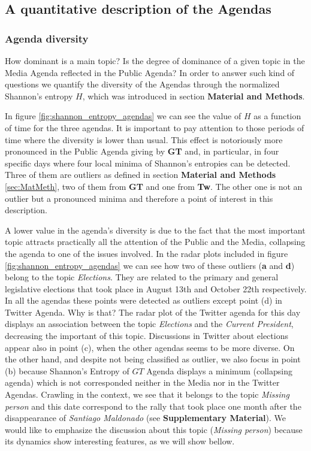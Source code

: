 \documentclass{bmcart}
\begin{document}
\subsection*{A quantitative description of the Agendas}

\subsubsection*{Agenda diversity}

\par How dominant is a main topic? Is the degree of dominance of a given topic in the Media Agenda reflected in the Public Agenda? In order to answer such kind of questions we quantify the diversity of the Agendas through the normalized Shannon's entropy $H$, which was introduced in section \textbf{Material and Methods}.
\par In figure \ref{fig:shannon_entropy_agendas} we can see the value of $H$ as a function of time for the three agendas. It is important to pay attention to those periods of time where the diversity is lower than usual. This effect is notoriously more pronounced in the Public Agenda giving by \textbf{GT} and, in particular, in four specific days  where  four local minima of Shannon's entropies can be detected. Three of them are outliers as defined in section \textbf{Material and Methods} \ref{sec:MatMeth}, two of them from \textbf{GT} and one from \textbf{Tw}. The other one is not an outlier but a pronounced minima and therefore a point of interest in this description. 
 
\par A lower value in the agenda's diversity is due to the fact that the most important topic attracts practically all the attention of the Public and the Media, collapsing the agenda to one of the issues involved.
In the radar plots included in figure \ref{fig:shannon_entropy_agendas} we can see how two of these outliers (\textbf{a} and \textbf{d}) belong to the topic \emph{Elections}. They are related to the primary and general legislative elections that took place in August 13th and October 22th respectively.
In all the agendas these points were detected as outliers except point (d) in Twitter Agenda. Why is that? The radar plot of the Twitter agenda for this day displays an association between the topic \emph{Elections} and the \emph{Current President}, decreasing the important of this topic.
Discussions in Twitter about elections appear also in point (c), when the other agendas seems to be more diverse. 
On the other hand, and despite not being classified as outlier, we also focus in point (b) because Shannon's Entropy of $GT$ Agenda displays a minimum (collapsing agenda) which is not corresponded neither in the Media nor in the Twitter Agendas. Crawling in the context, we see that it belongs to the topic \emph{Missing person} and this date correspond to the rally that took place one month after the disappearance of \emph{Santiago Maldonado} (see \textbf{Supplementary Material}). 
We  would like to emphasize the discussion about this topic (\emph{Missing person}) because its dynamics show interesting features, as we will show bellow.
\end{document}
